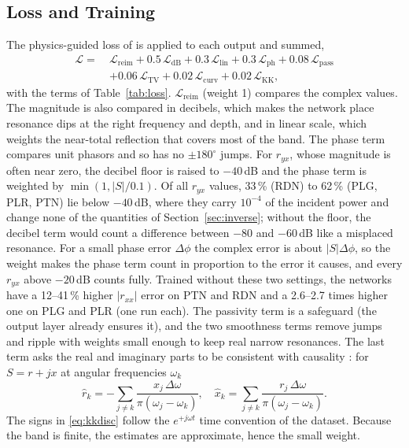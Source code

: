 \documentclass[journal]{IEEEtran}
\newcommand{\Lloss}[1]{\mathcal{L}_{\mathrm{#1}}}
\begin{document}
\subsection{Loss and Training}
The physics-guided loss of \cite{edgeaware} is applied to each output and summed,
\begin{align}
\mathcal{L} = \ &\Lloss{reim} + 0.5\,\Lloss{dB} + 0.3\,\Lloss{lin} + 0.3\,\Lloss{ph} + 0.08\,\Lloss{pass} \nonumber\\
&+ 0.06\,\Lloss{TV} + 0.02\,\Lloss{curv} + 0.02\,\Lloss{KK},
\label{eq:total}
\end{align}
with the terms of Table~\ref{tab:loss}. $\Lloss{reim}$ (weight 1) compares the complex values. The magnitude is also compared in decibels, which makes the network place resonance dips at the right frequency and depth, and in linear scale, which weights the near-total reflection that covers most of the band. The phase term compares unit phasors and so has no $\pm180^\circ$ jumps. For $r_{yx}$, whose magnitude is often near zero, the decibel floor is raised to $-40$\,dB and the phase term is weighted by $\min(1,|S|/0.1)$. Of all $r_{yx}$ values, 33\,\% (RDN) to 62\,\% (PLG, PLR, PTN) lie below $-40$\,dB, where they carry $10^{-4}$ of the incident power and change none of the quantities of Section~\ref{sec:inverse}; without the floor, the decibel term would count a difference between $-80$ and $-60$\,dB like a misplaced resonance. For a small phase error $\Delta\phi$ the complex error is about $|S|\Delta\phi$, so the weight makes the phase term count in proportion to the error it causes, and every $r_{yx}$ above $-20$\,dB counts fully. Trained without these two settings, the networks have a 12--41\,\% higher $|r_{xx}|$ error on PTN and RDN and a 2.6--2.7 times higher one on PLG and PLR (one run each). The passivity term is a safeguard (the output layer already ensures it), and the two smoothness terms remove jumps and ripple with weights small enough to keep real narrow resonances. The last term asks the real and imaginary parts to be consistent with causality \cite{lucarini}: for $S=r+jx$ at angular frequencies $\omega_k$
\begin{equation}
\hat{r}_k=-\sum_{j\neq k}\frac{x_j\,\Delta\omega}{\pi(\omega_j-\omega_k)},
\quad
\hat{x}_k=\sum_{j\neq k}\frac{r_j\,\Delta\omega}{\pi(\omega_j-\omega_k)} .
\label{eq:kkdisc}
\end{equation}
The signs in \eqref{eq:kkdisc} follow the $e^{+j\omega t}$ time convention of the dataset. Because the band is finite, the estimates are approximate, hence the small weight.
\end{document}
